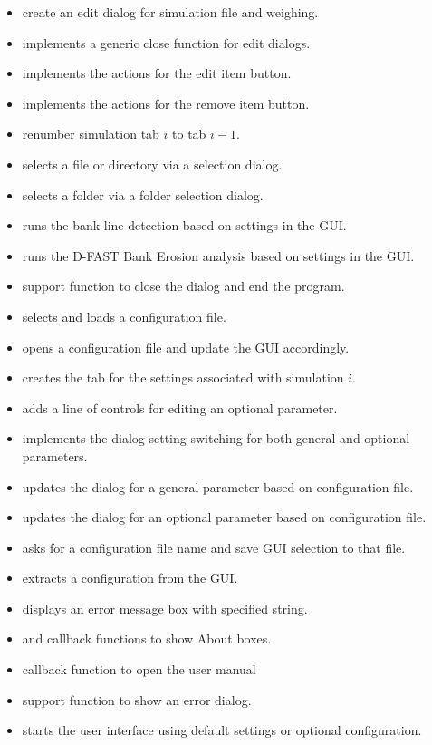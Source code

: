 \begin{itemize}
\item {} create an edit dialog for simulation file and weighing.
\item {} implements a generic close function for edit dialogs.
\item {} implements the actions for the edit item button.
\item {} implements the actions for the remove item button.
\item {} renumber simulation tab $i$ to tab $i-1$.
\item {} selects a file or directory via a selection dialog.
\item {} selects a folder via a folder selection dialog.
\item {} runs the bank line detection based on settings in the GUI.
\item {} runs the D-FAST Bank Erosion analysis based on settings in the GUI.
\item {} support function to close the dialog and end the program.
\item {} selects and loads a configuration file.
\item {} opens a configuration file and update the GUI accordingly.
\item {} creates the tab for the settings associated with simulation $i$.
\item {} adds a line of controls for editing an optional parameter.
\item {} implements the dialog setting switching for both general and optional parameters.
\item {} updates the dialog for a general parameter based on configuration file.
\item {} updates the dialog for an optional parameter based on configuration file.
\item {} asks for a configuration file name and save GUI selection to that file.
\item {} extracts a configuration from the GUI.
\item {} displays an error message box with specified string.
\item {} and  callback functions to show About boxes.
\item {} callback function to open the user manual
\item {} support function to show an error dialog.
\item {} starts the user interface using default settings or optional configuration.
\end{itemize}


